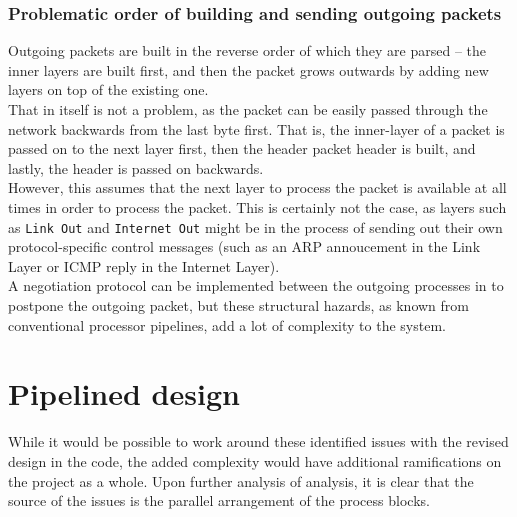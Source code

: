 \subsubsection{Problematic order of building and sending outgoing packets}
Outgoing packets are built in the reverse order of which they are parsed -- the
inner layers are built first, and then the packet grows outwards by adding new
layers on top of the existing one.\\
That in itself is not a problem, as the packet can be easily passed through the
network backwards from the last byte first. That is, the inner-layer of a packet
is passed on to the next layer first, then the header packet header is built,
and lastly, the header is passed on backwards.\\
However, this assumes that the next layer to process the packet is available at
all times in order to process the packet. This is certainly not the case, as
layers such as \texttt{Link Out} and \texttt{Internet Out} might be in the
process of sending out their own protocol-specific control messages (such as
an ARP annoucement in the Link Layer or ICMP reply in the Internet Layer).\\
A negotiation protocol can be implemented between the outgoing processes in to
postpone the outgoing packet, but these structural hazards, as known from
conventional processor pipelines, add a lot of complexity to the system.






\section{Pipelined design}
While it would be possible to work around these identified issues with the
revised design in the code, the
added complexity would have additional ramifications on the project as a whole.
Upon further analysis of analysis, it is clear that the source of the issues is
the parallel arrangement of the process blocks.

